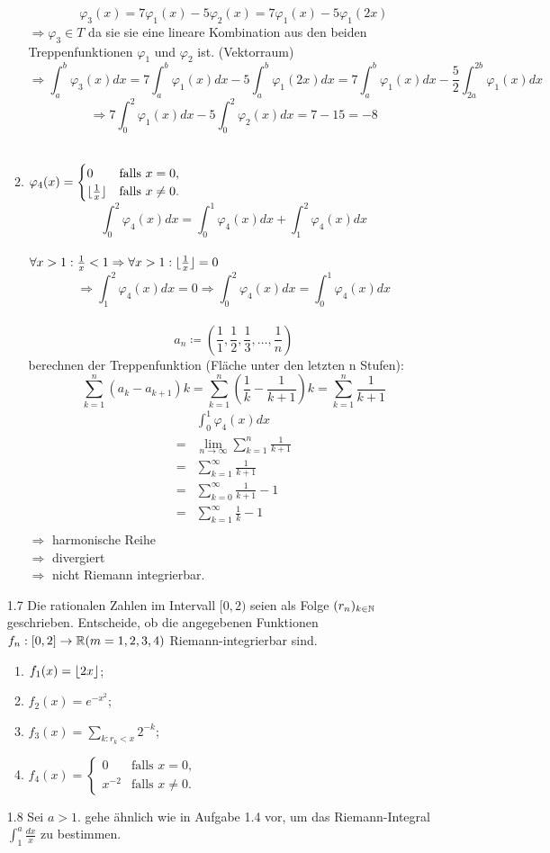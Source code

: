 \documentclass{HM}
\begin{document}
\begin{enumerate}
\begin{enumerate}
				$$\varphi_3(x)=7\varphi_1(x)-5\varphi_2(x)=7\varphi_1(x)-5\varphi_1(2x)$$
				$\Rightarrow \varphi_3\in T$ da sie sie eine lineare Kombination aus den beiden Treppenfunktionen $\varphi_1$ und $\varphi_2$ ist. (Vektorraum)
				$$\Rightarrow \int_a^b\varphi_3(x)dx=
				7\int_a^b\varphi_1(x)dx-5\int_a^b\varphi_1(2x)dx=
				7\int_a^b\varphi_1(x)dx-\frac{5}{2}\int_{2a}^{2b}\varphi_1(x)dx$$
				$$\Rightarrow 7\int_0^2\varphi_1(x)dx-5\int_0^2\varphi_2(x)dx=7-15=-8$$\\
			\item $\varphi_4(x)=\begin{cases}
				0&\text{falls }x=0,\\
				\lfloor\frac{1}{x}\rfloor&\text{falls }x\neq 0.			
			\end{cases}$
			$$\int_0^2\varphi_4(x)dx=\int_0^1\varphi_4(x)dx+\int_1^2\varphi_4(x)dx$$\\
			$\forall x>1:\frac{1}{x}<1\Rightarrow\forall x>1:\lfloor\frac{1}{x}\rfloor=0$
			$$\Rightarrow\int_1^2\varphi_4(x)dx=0\Rightarrow\int_0^2\varphi_4(x)dx=\int_0^1\varphi_4(x)dx$$\\
			$$a_n\coloneqq(\frac{1}{1},\frac{1}{2},\frac{1}{3},\hdots,\frac{1}{n})$$
			berechnen der Treppenfunktion (Fläche unter den letzten n Stufen): $$\sum_{k=1}^n(a_k-a_{k+1})k=\sum_{k=1}^n(\frac{1}{k}-\frac{1}{k+1})k=\sum_{k=1}^n\frac{1}{k+1}$$
			\begin{align*}
				&\int_0^1\varphi_4(x)dx\\
				=&\lim\limits_{n\to\infty}\sum_{k=1}^n\frac{1}{k+1}\\
				=&\sum\limits_{k=1}^\infty\frac{1}{k+1}\\
				=&\sum\limits_{k=0}^\infty\frac{1}{k+1}-1\\
				=&\sum\limits_{k=1}^\infty\frac{1}{k}-1\\
			\end{align*}
			$\Rightarrow$ harmonische Reihe\\
			$\Rightarrow$ divergiert\\
			$\Rightarrow$ nicht Riemann integrierbar.
		\end{enumerate}
		
		\item[1.7] Die rationalen Zahlen im Intervall $[0,2)$ seien als Folge $(r_n)_{k\in\mathbb{N}}$ geschrieben. Entscheide, ob die angegebenen Funktionen $f_n:[0,2]\to\mathbb{R}(m=1,2,3,4)$ Riemann-integrierbar sind.
		\begin{enumerate}
			\item $f_1(x)=\lfloor2x\rfloor$;
			\item $f_2(x)=e^{-x^{2}}$;
			\item $f_3(x)=\sum\limits_{k:r_k<x}2^{-k}$;
			\item $f_4(x)=\begin{cases}
				0&\text{falls }x=0,\\
				x^{-2}&\text{falls }x\neq 0.			
			\end{cases}$
		\end{enumerate}
		
		\item[1.8] Sei $a>1$. gehe ähnlich wie in Aufgabe 1.4 vor, um das Riemann-Integral $\int_1^a\frac{dx}{x}$ zu bestimmen.
	\end{enumerate}
\end{document}

